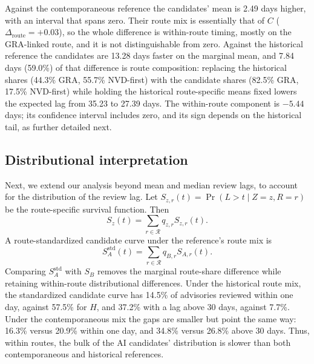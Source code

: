 \documentclass[smallextended,natbib]{svjour3}
\begin{document}
Against the contemporaneous reference the candidates' mean is 2.49 days higher,
with an interval that spans zero.  Their route mix is essentially that of $C$
($\Delta_{\mathrm{route}}=+0.03$), so the whole difference is within-route
timing, mostly on the GRA-linked route, and it is not distinguishable from
zero.  Against the historical reference the candidates are 13.28 days
faster on the marginal mean, and 7.84 days (59.0\%) of that difference is route
composition: replacing the historical shares (44.3\% GRA, 55.7\% NVD-first)
with the candidate shares (82.5\% GRA, 17.5\% NVD-first) while holding the
historical route-specific means fixed lowers the expected lag from 35.23 to
27.39 days.  The within-route component is $-5.44$ days; its confidence  interval includes
zero, and its sign depends on the historical tail, as further detailed next. 

\subsection{Distributional interpretation}
\label{sec:distributional-standardization}

Next, we extend our analysis beyond mean and median review lags, to account for the  distribution of the review lag. 
  Let
$S_{z,r}(t)=\Pr(L>t\mid Z=z,R=r)$ be the route-specific survival function.
Then
\begin{equation}
S_z(t)=\sum_{r\in\mathcal{R}}q_{z,r}S_{z,r}(t).
\label{eq:survivalmix}
\end{equation}
A route-standardized candidate curve under the reference's route mix is
\begin{equation}
S_A^{\mathrm{std}}(t)=
\sum_{r\in\mathcal{R}}q_{B,r}S_{A,r}(t).
\label{eq:standardized}
\end{equation}
Comparing $S_A^{\mathrm{std}}$ with $S_B$ removes the marginal route-share
difference while retaining within-route distributional differences.  Under the
historical route mix, the standardized candidate curve has 14.5\% of
advisories reviewed within one day, against 57.5\% for $H$, and 37.2\% with a
lag above 30 days, against 7.7\%.  Under the contemporaneous mix the gaps are
smaller but point the same way: 16.3\% versus 20.9\% within one day, and 34.8\%
versus 26.8\% above 30 days.  Thus, within routes, the bulk of the AI   candidates'
distribution is slower than both contemporaneous and historical references.
\end{document}
